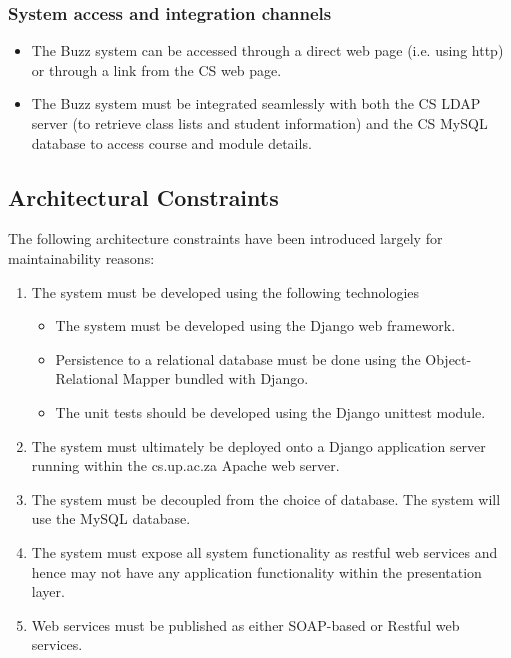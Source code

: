 \documentclass[12pt, oneside]{article}
\begin{document}
				\subsubsection{System access and integration channels}
				\begin{itemize}
					\item The Buzz system can be accessed through a direct web page (i.e. using http) or through a link from the CS web page.
					\item The Buzz system must be integrated seamlessly with both the CS LDAP server (to retrieve class lists and student information) and the CS MySQL database to access course and module details.
				\end{itemize}
	\subsection{Architectural Constraints}		
	The following architecture constraints have been introduced largely for maintainability reasons:
\begin{enumerate}
	\item The system must be developed using the following technologies
	\begin{itemize}
		\item The system must be developed using the Django web framework.
		\item Persistence to a relational database must be done using the Object-Relational Mapper bundled with Django.
		\item The unit tests should be developed using the Django unittest module.
	\end{itemize}

	\item The system must ultimately be deployed onto a Django application server running within the cs.up.ac.za Apache web server.
	\item The system must be decoupled from the choice of database. The system will use the MySQL database.
	\item The system must expose all system functionality as restful web services and hence may not have any application functionality within the presentation layer.
	\item Web services must be published as either SOAP-based or Restful web services.
\end{enumerate}
\end{document}
